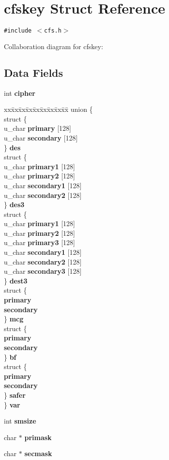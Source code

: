 \section{cfskey Struct Reference}
\label{structcfskey}
{\tt \#include $<$cfs.h$>$}

Collaboration diagram for cfskey:\subsection*{Data Fields}
\begin{CompactItemize}
\item 
int {\bf cipher}
\item 
\begin{tabbing}
xx\=xx\=xx\=xx\=xx\=xx\=xx\=xx\=xx\=\kill
union \{\\
\>struct \{\\
\>\>u\_char {\bf primary} [128]\\
\>\>u\_char {\bf secondary} [128]\\
\>\} {\bf des}\\
\>struct \{\\
\>\>u\_char {\bf primary1} [128]\\
\>\>u\_char {\bf primary2} [128]\\
\>\>u\_char {\bf secondary1} [128]\\
\>\>u\_char {\bf secondary2} [128]\\
\>\} {\bf des3}\\
\>struct \{\\
\>\>u\_char {\bf primary1} [128]\\
\>\>u\_char {\bf primary2} [128]\\
\>\>u\_char {\bf primary3} [128]\\
\>\>u\_char {\bf secondary1} [128]\\
\>\>u\_char {\bf secondary2} [128]\\
\>\>u\_char {\bf secondary3} [128]\\
\>\} {\bf dest3}\\
\>struct \{\\
\> {\bf primary}\\
\> {\bf secondary}\\
\>\} {\bf mcg}\\
\>struct \{\\
\> {\bf primary}\\
\> {\bf secondary}\\
\>\} {\bf bf}\\
\>struct \{\\
\> {\bf primary}\\
\> {\bf secondary}\\
\>\} {\bf safer}\\
\} {\bf var}\\

\end{tabbing}\item 
int {\bf smsize}
\item 
char $\ast$ {\bf primask}
\item 
char $\ast$ {\bf secmask}
\end{CompactItemize}


